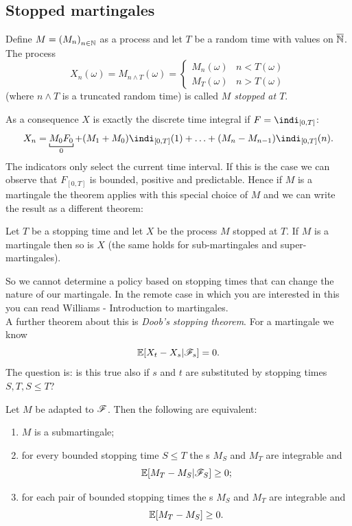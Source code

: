 \documentclass{report}
\begin{document}
\subsection{Stopped martingales}
\begin{definition}
	Define $M={(M_{n})}_{n\in\mathbb{N}}$ as a process and let $T$ be a random time with values on $\overline{\mathbb{N}}$. The process
	\[X_{n}(\omega)=M_{n\wedge T}(\omega)=\begin{cases}
		M_{n}(\omega)&n<T(\omega)\\
		M_{T}(\omega)&n>T(\omega)
	\end{cases}\]
	(where $n\wedge T$ is a truncated random time) is called \emph{$M$ stopped at $T$}.
\end{definition}
As a consequence $X$ is exactly the discrete time integral if $F=\indi_{[0,T]}$:
\begin{equation*}
	X_{n}=\underbracket[0.6pt]{M_0F_0}_{0}+(M_{1}+M_{0})\indi_{[0,T]}(1)+\ldots+(M_{n}-M_{n-1})\indi_{[0,T]}(n).
\end{equation*}
The indicators only select the current time interval. If this is the case we can observe that $F_{[0,T]}$ is bounded, positive and predictable. Hence if $M$ is a martingale the theorem applies with this special choice of $M$ and we can write the result as a different theorem:
\begin{theorem}
	Let $T$ be a stopping time and let $X$ be the process $M$ stopped at $T$. If $M$ is a martingale then so is $X$ (the same holds for sub-martingales and super-martingales).
\end{theorem}
So we cannot determine a policy based on stopping times that can change the nature of our martingale. In the remote case in which you are interested in this you can read Williams - Introduction to martingales. \\
A further theorem about this is \emph{Doob's stopping theorem}. For a martingale we know
\[\mathbb{E}[X_{t}-X_{s}|\mathscr{F}_{s}]=0.\]
The question is: is this true also if $s$ and $t$ are substituted by stopping times $S,T,S\leq T$?
\begin{theorem}
	Let $M$ be adapted to $\mathscr{F}$. Then the following are equivalent:
	\begin{enumerate}[\circnum]
		\item $M$ is a submartingale;
		\item for every bounded stopping time $S\leq T$ the \rv s $M_{S}$ and $M_{T}$ are integrable and 
		\[\mathbb{E}[M_{T}-M_{S}|\mathscr{F}_{S}]\geq0;\]
		\item for each pair of bounded stopping times the \rv s $M_{S}$ and $M_{T}$ are integrable and 
		\[\mathbb{E}[M_{T}-M_{S}]\geq 0.\] 
	\end{enumerate}
\end{theorem}
\end{document}
